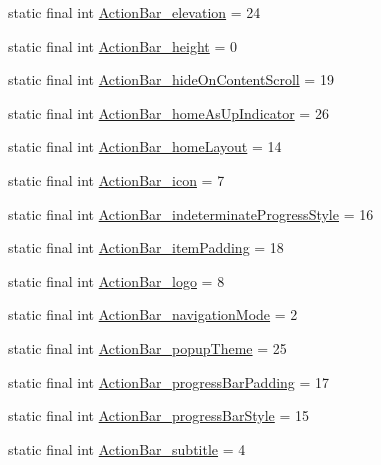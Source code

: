 \begin{DoxyCompactItemize}
\item 
static final int \hyperlink{classcheck_1_1test_1_1_r_1_1styleable_a04317e16738cdda5538f180e12395b7c}{Action\+Bar\+\_\+elevation} = 24
\item 
static final int \hyperlink{classcheck_1_1test_1_1_r_1_1styleable_a1ad8ab9094975d894200659bb15e67fd}{Action\+Bar\+\_\+height} = 0
\item 
static final int \hyperlink{classcheck_1_1test_1_1_r_1_1styleable_a62a234e7f0069b54f7bc50a087a598a6}{Action\+Bar\+\_\+hide\+On\+Content\+Scroll} = 19
\item 
static final int \hyperlink{classcheck_1_1test_1_1_r_1_1styleable_a84fd3d85c1d60971f8574c3b4809433a}{Action\+Bar\+\_\+home\+As\+Up\+Indicator} = 26
\item 
static final int \hyperlink{classcheck_1_1test_1_1_r_1_1styleable_a2036cd83e6c7153acfac1a87f273dbe5}{Action\+Bar\+\_\+home\+Layout} = 14
\item 
static final int \hyperlink{classcheck_1_1test_1_1_r_1_1styleable_a59d128f0d74801dcc8e66e1748460fed}{Action\+Bar\+\_\+icon} = 7
\item 
static final int \hyperlink{classcheck_1_1test_1_1_r_1_1styleable_aa15c171a89aa6949c69bf05ac296389c}{Action\+Bar\+\_\+indeterminate\+Progress\+Style} = 16
\item 
static final int \hyperlink{classcheck_1_1test_1_1_r_1_1styleable_a1e919ff125d9a130e6515a258bc0ebbd}{Action\+Bar\+\_\+item\+Padding} = 18
\item 
static final int \hyperlink{classcheck_1_1test_1_1_r_1_1styleable_ac94a2b6df672cef0c246aff7b6bfaa23}{Action\+Bar\+\_\+logo} = 8
\item 
static final int \hyperlink{classcheck_1_1test_1_1_r_1_1styleable_a52cd104b62a9b6372ea39bd7da78cb1b}{Action\+Bar\+\_\+navigation\+Mode} = 2
\item 
static final int \hyperlink{classcheck_1_1test_1_1_r_1_1styleable_a50824fb411f147909363103d29b2ac25}{Action\+Bar\+\_\+popup\+Theme} = 25
\item 
static final int \hyperlink{classcheck_1_1test_1_1_r_1_1styleable_a535160a98b5036d981b4bc255935336a}{Action\+Bar\+\_\+progress\+Bar\+Padding} = 17
\item 
static final int \hyperlink{classcheck_1_1test_1_1_r_1_1styleable_a3789f8c4018be856bcd214951aadcb71}{Action\+Bar\+\_\+progress\+Bar\+Style} = 15
\item 
static final int \hyperlink{classcheck_1_1test_1_1_r_1_1styleable_a84729c20d79b553693df4d068f7a3ceb}{Action\+Bar\+\_\+subtitle} = 4

\end{DoxyCompactItemize}
